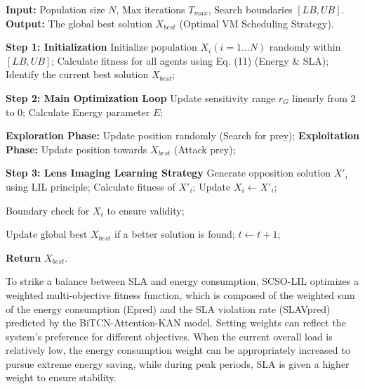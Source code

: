 \documentclass[conference]{{IEEEtran}}
\begin{document}
\begin{algorithm}[!t] 
\caption{Improved SCSO Algorithm with Lens Imaging Learning (LIL)}
\label{alg:scso_lil}
\begin{algorithmic}[1]
\State \textbf{Input:} Population size $N$, Max iterations $T_{max}$, Search boundaries $[LB, UB]$.
\State \textbf{Output:} The global best solution $X_{best}$ (Optimal VM Scheduling Strategy).

\State \textbf{Step 1: Initialization}
\State Initialize population $X_i (i=1...N)$ randomly within $[LB, UB]$;
\State Calculate fitness for all agents using Eq. (11) (Energy \& SLA);
\State Identify the current best solution $X_{best}$;

\State \textbf{Step 2: Main Optimization Loop}
    \State Update sensitivity range $r_G$ linearly from 2 to 0;
        \State Calculate Energy parameter $E$; 
        
            \State \textbf{Exploration Phase:} Update position randomly (Search for prey);
        \Else
            \State \textbf{Exploitation Phase:} Update position towards $X_{best}$ (Attack prey);
        \EndIf
        
        \State \textbf{Step 3: Lens Imaging Learning Strategy}
        \State Generate opposition solution $X'_{i}$ using LIL principle;
        \State Calculate fitness of $X'_{i}$;
            \State Update $X_{i} \leftarrow X'_{i}$; 
        \EndIf
        
        \State Boundary check for $X_i$ to ensure validity;
    \EndFor
    
    \State Update global best $X_{best}$ if a better solution is found;
    \State $t \leftarrow t + 1$;
\EndWhile

\State \textbf{Return} $X_{best}$.
\end{algorithmic}
\end{algorithm}

To strike a balance between SLA and energy consumption, SCSO-LIL optimizes a weighted multi-objective fitness function, which is composed of the weighted sum of the energy consumption (Epred) and the SLA violation rate (SLAVpred) predicted by the BiTCN-Attention-KAN model. Setting weights can reflect the system's preference for different objectives. When the current overall load is relatively low, the energy consumption weight can be appropriately increased to pursue extreme energy saving, while during peak periods, SLA is given a higher weight to ensure stability.
\end{document}
